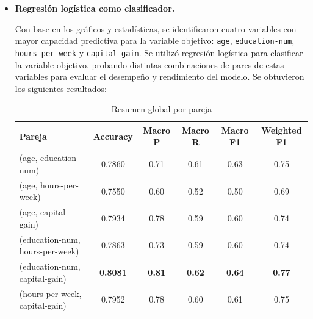 \documentclass[12pt,a4paper]{article}
\begin{document}
\begin{enumerate}
\begin{itemize}
      \item \textbf{Regresión logística como clasificador.}

      Con base en los gráficos y estadísticas, se identificaron cuatro variables con mayor capacidad predictiva para la 
      variable objetivo: \texttt{age}, \texttt{education-num}, \texttt{hours-per-week} y \texttt{capital-gain}. Se utilizó regresión logística 
      para clasificar la variable objetivo, probando distintas combinaciones de pares de estas variables para evaluar el desempeño y rendimiento 
      del modelo. Se obtuvieron los siguientes resultados:

      \begin{table}[H]
        \centering
        \small
        \begin{tabular}{lccccc}
          \toprule
          \textbf{Pareja} & \textbf{Accuracy} & \textbf{Macro P} & \textbf{Macro R} & \textbf{Macro F1} & \textbf{Weighted F1} \\
          \midrule
          (age, education-num)           & 0.7860 & 0.71 & 0.61 & 0.63 & 0.75 \\
          (age, hours-per-week)          & 0.7550 & 0.60 & 0.52 & 0.50 & 0.69 \\
          (age, capital-gain)            & 0.7934 & 0.78 & 0.59 & 0.60 & 0.74 \\
          (education-num, hours-per-week)& 0.7863 & 0.73 & 0.59 & 0.60 & 0.74 \\
          (education-num, capital-gain)  & \textbf{0.8081} & \textbf{0.81} & \textbf{0.62} & \textbf{0.64} & \textbf{0.77} \\
          (hours-per-week, capital-gain) & 0.7952 & 0.78 & 0.60 & 0.61 & 0.75 \\
          \bottomrule
        \end{tabular}
        \caption{Resumen global por pareja}
        \label{tab:resumen_global_parejas}
      \end{table}


\end{itemize}
\end{enumerate}
\end{document}
